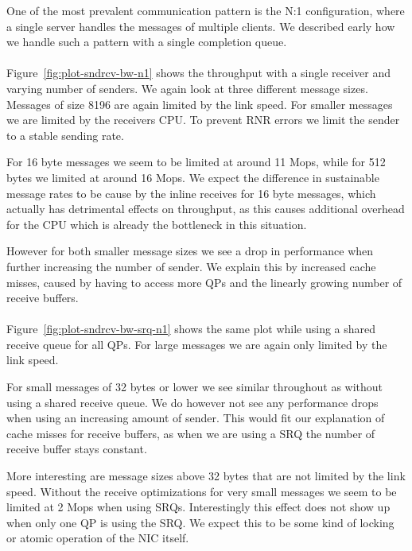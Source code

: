 One of the most prevalent communication pattern is the N:1 configuration, where a single server handles the messages
of multiple clients. We described early how we handle such a pattern with a single completion queue.

\paragraph{} Figure~\ref{fig:plot-sndrcv-bw-n1} shows the throughput with a single receiver and varying number of senders.
We again look at three different message sizes. Messages of size 8196 are again limited by the link speed. For smaller messages
we are limited by the receivers CPU. To prevent RNR errors we limit the sender to a stable sending rate.

For 16 byte messages we seem to be limited at around 11 Mops, while for 512 bytes we limited at around 16 Mops. We expect the
difference in sustainable message rates to be cause by the inline receives for 16 byte messages, which actually has detrimental
effects on throughput, as this causes additional overhead for the CPU which is already the bottleneck in this situation.

However for both smaller message sizes we see a drop in performance when further increasing the number of sender. We explain 
this by increased cache misses, caused by having to access more QPs and the linearly growing number of receive buffers.

\paragraph{} Figure~\ref{fig:plot-sndrcv-bw-srq-n1} shows the same plot while using a shared receive queue for all QPs. For
large messages we are again only limited by the link speed.

For small messages of 32 bytes or lower we see similar throughout
as without using a shared receive queue. We do however not see any performance drops when using an increasing amount of sender.
This would fit our explanation of cache misses for receive buffers, as when we are using a SRQ the number of receive buffer
stays constant. 


More interesting are message sizes above 32 bytes that are not limited by the link speed. Without the receive optimizations 
for very small messages we seem to be limited at 2 Mops when using SRQs. Interestingly this effect does not show up when only
one QP is using the SRQ. We expect this to be some kind of locking or atomic operation of the NIC itself.





